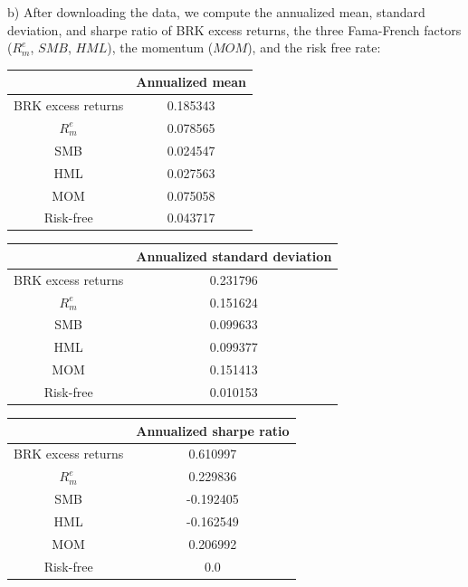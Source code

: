 \documentclass[10pt]{article}
\newenvironment{exercise}[2][Exercise]{\begin{trivlist}
  \item[\hskip \labelsep {\bfseries #1}\hskip \labelsep {\bfseries #2.}]}{\end{trivlist}}
\begin{document}
\begin{exercise}{3}

	(b) After downloading the data, we compute the annualized mean, standard deviation, and sharpe ratio of BRK excess returns, the three Fama-French factors ($R_{m}^{e}$, $SMB$, $HML$), the momentum ($MOM$), and the risk free rate:

	\begin{table}[h!]
		\centering
 		\begin{tabular}{||c c||} 
 			\hline
 			& Annualized mean \\ [0.5ex] 
 			\hline\hline
 			BRK excess returns & 0.185343 \\ 
 			$R_{m}^{e}$ & 0.078565 \\
 			SMB & 0.024547 \\
 			HML & 0.027563 \\
 		    MOM & 0.075058 \\
 			Risk-free & 0.043717 \\ [1ex] 
 			\hline
		 \end{tabular}
	\end{table}	

	\begin{table}[h!]
		\centering
 		\begin{tabular}{||c c||} 
 			\hline
 			& Annualized standard deviation \\ [0.5ex] 
 			\hline\hline
 			BRK excess returns & 0.231796 \\ 
 			$R_{m}^{e}$ & 0.151624 \\
 			SMB & 0.099633 \\
 			HML & 0.099377 \\
 		    MOM & 0.151413 \\
 			Risk-free & 0.010153 \\ [1ex] 
 			\hline
		 \end{tabular}
	\end{table}	

	\begin{table}[h!]
		\centering
 		\begin{tabular}{||c c||} 
 			\hline
 			& Annualized sharpe ratio \\ [0.5ex] 
 			\hline\hline
 			BRK excess returns & 0.610997 \\ 
 			$R_{m}^{e}$ & 0.229836 \\
 			SMB & -0.192405 \\
 			HML & -0.162549 \\
 		    MOM & 0.206992 \\
 			Risk-free & 0.0 \\ [1ex] 
 			\hline
		 \end{tabular}
	\end{table}	
	

\end{exercise}
\end{document}
